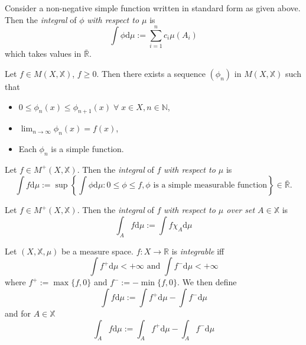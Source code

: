 \begin{definition}
    Consider a non-negative simple function written in standard form as given above.
    Then the \emph{integral} of $\phi$ \emph{with respect to $\mu$} is
    \begin{equation}
        \int\phi\mathrm d\mu:=\sum_{i=1}^nc_i\mu(A_i)
    \end{equation}
    which takes values in $\bar{\mathbb{R}}$.
\end{definition}

\begin{lemma}
    Let $f\in M(X,\mathbb{X})$, $f\geq0.$ Then there exists a sequence
    $(\phi_n)$ in $M(X,\mathbb{X})$ such that
    \begin{itemize}
        \item $0\leq\phi_n(x)\leq\phi_{n+1}(x)\;\forall\;x\in X,n\in\mathbb{N}$,
        \item $\lim_{n\rightarrow\infty}\phi_n(x)=f(x)$,
        \item Each $\phi_n$ is a simple function.
    \end{itemize}
\end{lemma}

\begin{definition}
    Let $f\in M^+(X,\mathbb{X})$. Then the \emph{integral} of $f$ 
    \emph{with respect to $\mu$} is 
    \begin{equation*}
        \int f\mathrm d\mu := \sup\left\{\int\phi\mathrm d\mu : 0\leq\phi\leq f, \phi\textrm{ is a simple measurable function}\right\}\in\bar{\mathbb{R}}.
    \end{equation*}
\end{definition}

\begin{definition}
    Let $f\in M^+(X,\mathbb{X})$. Then the \emph{integral} of $f$
    \emph{with respect to $\mu$ over set $A\in \mathbb{X}$} is
    \begin{equation}
        \int_A f\mathrm d\mu:=\int f\chi_A\mathrm d\mu
    \end{equation}
\end{definition}

\begin{definition}
    Let $(X,\mathbb{X},\mu)$ be a measure space. $f:X\rightarrow\mathbb{R}$
    is \emph{integrable} iff 
    \begin{equation}
        \int f^+\mathrm d\mu<+\infty \textrm{ and }\int f^-\mathrm d\mu<+\infty
    \end{equation}
    where $f^+:=\max\{f,0\}$ and $f^-:=-\min\{f,0\}$.
    We then define
    \begin{equation}
        \int f\mathrm d\mu:=\int f^+\mathrm d\mu -\int f^-\mathrm d\mu
    \end{equation}
    and for $A\in\mathbb{X}$
    \begin{equation}
        \int_A f\mathrm d\mu:=\int_A f^+\mathrm d\mu -\int_A f^-\mathrm d\mu
    \end{equation}
\end{definition}

